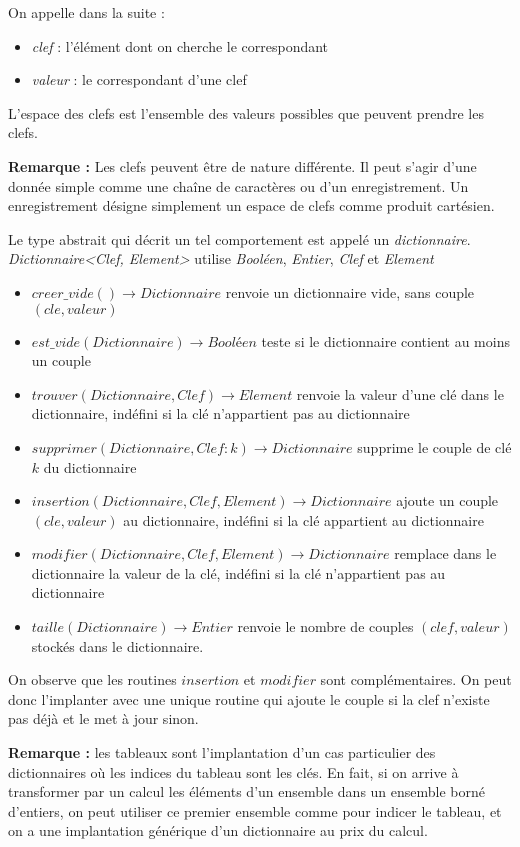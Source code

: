 \documentclass[../../../main.tex]{subfiles}
\begin{document}
On appelle dans la suite :
\begin{itemize}
	\item \textit{clef} : l'élément dont on cherche le correspondant
	\item \textit{valeur} : le correspondant d'une clef
\end{itemize}
L'espace des clefs est l'ensemble des valeurs possibles que peuvent prendre les clefs.

\textbf{Remarque :} Les clefs peuvent être de nature différente. Il peut s'agir d'une donnée simple comme une chaîne de caractères ou d'un enregistrement. Un enregistrement désigne simplement un espace de clefs comme produit cartésien.

Le type abstrait qui décrit un tel comportement est appelé un \textit{dictionnaire}. \newline
\textit{Dictionnaire\textless Clef, Element\textgreater} utilise \textit{Booléen}, \textit{Entier}, \textit{Clef} et \textit{Element}
\begin{itemize}
	\item $creer\_vide()\rightarrow Dictionnaire$ renvoie un dictionnaire vide, sans couple $(cle, valeur)$
	\item $est\_vide(Dictionnaire)\rightarrow \textit{Booléen}$ teste si le dictionnaire contient au moins un couple
	\item $trouver(Dictionnaire, Clef)\rightarrow Element$ renvoie la valeur d'une clé dans le dictionnaire, indéfini si la clé n'appartient pas au dictionnaire
	\item $supprimer(Dictionnaire, Clef:k)\rightarrow Dictionnaire$ supprime le couple de clé $k$ du dictionnaire
	\item $insertion(Dictionnaire, Clef, Element)\rightarrow Dictionnaire$ ajoute un couple $(cle, valeur)$ au dictionnaire, indéfini si la clé appartient au dictionnaire
	\item $modifier(Dictionnaire, Clef, Element)\rightarrow Dictionnaire$ remplace dans le dictionnaire la valeur de la clé, indéfini si la clé n'appartient pas au dictionnaire
	\item $taille(Dictionnaire)\rightarrow Entier$ renvoie le nombre de couples $(clef, valeur)$ stockés dans le dictionnaire.
\end{itemize}
On observe que les routines $insertion$ et $modifier$ sont complémentaires. On peut donc l'implanter avec une unique routine qui ajoute le couple si la clef n'existe pas déjà et le met à jour sinon.

\textbf{Remarque :} les tableaux sont l'implantation d'un cas particulier des dictionnaires où les indices du tableau sont les clés. En fait, si on arrive à transformer par un calcul les éléments d'un ensemble dans un ensemble borné d'entiers, on peut utiliser ce premier ensemble comme pour indicer le tableau, et on a une implantation générique d'un dictionnaire au prix du calcul.
\end{document}
